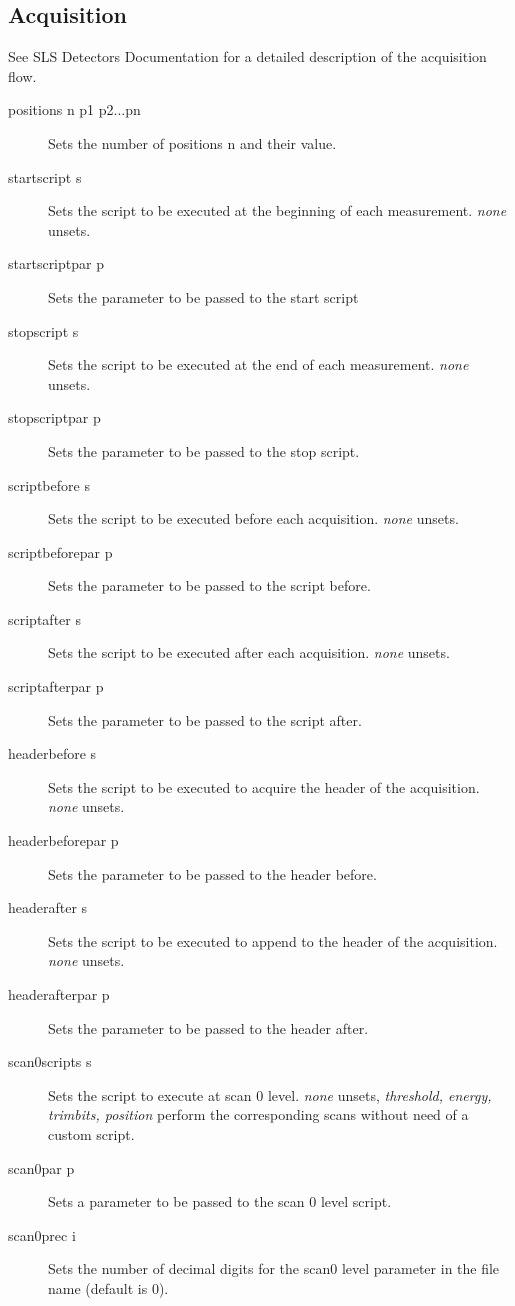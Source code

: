 \documentclass{article}
\begin{document}
\subsection{Acquisition}
See SLS Detectors Documentation for a detailed description of the acquisition flow.
\begin{description}
\item[positions n p1 p2...pn] Sets the number of positions n and their value.
 \item[startscript s] Sets the script to be executed at the beginning of each measurement.  \textit{none} unsets.
  \item[startscriptpar p] Sets the parameter to be passed to the start script
 \item[stopscript s] Sets the script to be executed at the end of each measurement.  \textit{none} unsets.    
 \item[stopscriptpar p] Sets the parameter to be passed to the stop script.
 \item[scriptbefore s] Sets the script to be executed before each acquisition.  \textit{none} unsets.    
 \item[scriptbeforepar p]  Sets the parameter to be passed to the script before.
 \item[scriptafter s]   Sets the script to be executed after each acquisition.  \textit{none} unsets.       
 \item[scriptafterpar p]    Sets the parameter to be passed to the script after.    
 \item[headerbefore s]   Sets the script to be executed to acquire the header of the acquisition.  \textit{none} unsets.     
 \item[headerbeforepar p]   Sets the parameter to be passed to the header before.
 \item[headerafter s]       Sets the script to be executed to append to the header of the acquisition.  \textit{none} unsets.   
 \item[headerafterpar p]   Sets the parameter to be passed to the header after.
 \item[scan0scripts s]   Sets the script to execute at scan 0 level.   \textit{none} unsets,  \textit{threshold, energy, trimbits, position} perform the corresponding scans without need of a custom script.    
 \item[scan0par p] Sets a parameter to be passed to the scan 0 level script.      
 \item[scan0prec i]   Sets the number of decimal digits for the scan0 level parameter in the file name (default is 0).

\end{description}
\end{document}
